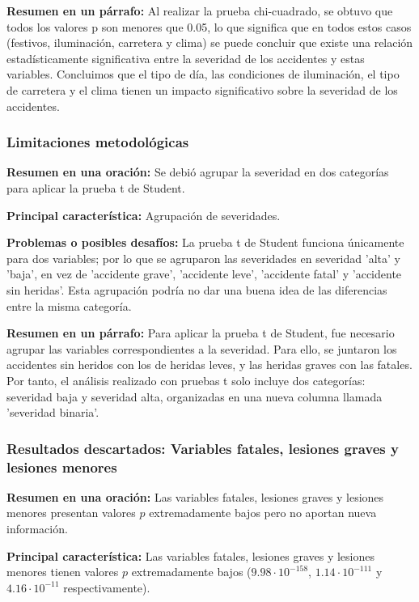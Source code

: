 \documentclass{book}
\begin{document}
\textbf{Resumen en un párrafo:} Al realizar la prueba chi-cuadrado, se obtuvo que todos los valores p son menores que 0.05, lo que significa que en todos estos casos (festivos, iluminación, carretera y clima) se puede concluir que existe una relación estadísticamente significativa entre la severidad de los accidentes y estas variables. Concluimos que el tipo de día, las condiciones de iluminación, el tipo de carretera y el clima tienen un impacto significativo sobre la severidad de los accidentes.


\subsubsection{Limitaciones metodológicas}
\textbf{Resumen en una oración:} Se debió agrupar la severidad en dos categorías para aplicar la prueba t de Student.

\textbf{Principal característica:} Agrupación de severidades.

\textbf{Problemas o posibles desafíos:} La prueba t de Student funciona únicamente para dos variables; por lo que se agruparon las severidades en severidad 'alta' y 'baja', en vez de 'accidente grave', 'accidente leve', 'accidente fatal' y 'accidente sin heridas'. Esta agrupación podría no dar una buena idea de las diferencias entre la misma categoría.

\textbf{Resumen en un párrafo:} Para aplicar la prueba t de Student, fue necesario agrupar las variables correspondientes a la severidad. Para ello, se juntaron los accidentes sin heridos con los de heridas leves, y las heridas graves con las fatales. Por tanto, el análisis realizado con pruebas t solo incluye dos categorías: severidad baja y severidad alta, organizadas en una nueva columna llamada 'severidad binaria'.


\subsubsection{Resultados descartados: Variables fatales, lesiones graves y lesiones menores}

\textbf{Resumen en una oración:} Las variables fatales, lesiones graves y lesiones menores presentan valores $p$ extremadamente bajos pero no aportan nueva información.

\textbf{Principal característica:} 
Las variables fatales, lesiones graves y lesiones menores tienen valores $p$ extremadamente bajos ($9.98 \cdot 10^{-158}$, $1.14 \cdot 10^{-111}$ y $4.16 \cdot 10^{-11}$ respectivamente).
\end{document}
